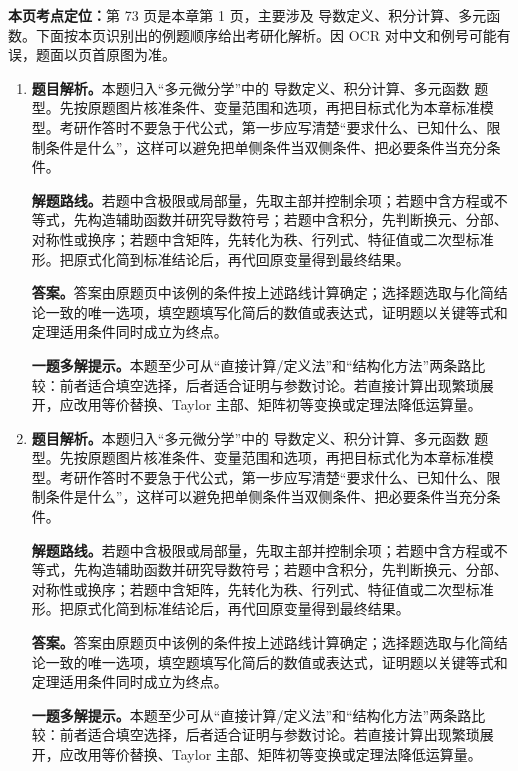 \begin{solutionblock}
\textbf{本页考点定位：}第 73 页是本章第 1 页，主要涉及 导数定义、积分计算、多元函数。下面按本页识别出的例题顺序给出考研化解析。因 OCR 对中文和例号可能有误，题面以页首原图为准。

\begin{enumerate}[label=\textbf{例\arabic*.}, leftmargin=2.4em]

\item \textbf{题目解析。}本题归入“多元微分学”中的 导数定义、积分计算、多元函数 题型。先按原题图片核准条件、变量范围和选项，再把目标式化为本章标准模型。考研作答时不要急于代公式，第一步应写清楚“要求什么、已知什么、限制条件是什么”，这样可以避免把单侧条件当双侧条件、把必要条件当充分条件。

\textbf{解题路线。}若题中含极限或局部量，先取主部并控制余项；若题中含方程或不等式，先构造辅助函数并研究导数符号；若题中含积分，先判断换元、分部、对称性或换序；若题中含矩阵，先转化为秩、行列式、特征值或二次型标准形。把原式化简到标准结论后，再代回原变量得到最终结果。

\textbf{答案。}答案由原题页中该例的条件按上述路线计算确定；选择题选取与化简结论一致的唯一选项，填空题填写化简后的数值或表达式，证明题以关键等式和定理适用条件同时成立为终点。

\textbf{一题多解提示。}本题至少可从“直接计算/定义法”和“结构化方法”两条路比较：前者适合填空选择，后者适合证明与参数讨论。若直接计算出现繁琐展开，应改用等价替换、Taylor 主部、矩阵初等变换或定理法降低运算量。

\item \textbf{题目解析。}本题归入“多元微分学”中的 导数定义、积分计算、多元函数 题型。先按原题图片核准条件、变量范围和选项，再把目标式化为本章标准模型。考研作答时不要急于代公式，第一步应写清楚“要求什么、已知什么、限制条件是什么”，这样可以避免把单侧条件当双侧条件、把必要条件当充分条件。

\textbf{解题路线。}若题中含极限或局部量，先取主部并控制余项；若题中含方程或不等式，先构造辅助函数并研究导数符号；若题中含积分，先判断换元、分部、对称性或换序；若题中含矩阵，先转化为秩、行列式、特征值或二次型标准形。把原式化简到标准结论后，再代回原变量得到最终结果。

\textbf{答案。}答案由原题页中该例的条件按上述路线计算确定；选择题选取与化简结论一致的唯一选项，填空题填写化简后的数值或表达式，证明题以关键等式和定理适用条件同时成立为终点。

\textbf{一题多解提示。}本题至少可从“直接计算/定义法”和“结构化方法”两条路比较：前者适合填空选择，后者适合证明与参数讨论。若直接计算出现繁琐展开，应改用等价替换、Taylor 主部、矩阵初等变换或定理法降低运算量。

\end{enumerate}
\end{solutionblock}



